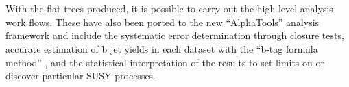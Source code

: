 \\\\
With the flat trees produced, it is possible to carry out the high level analysis work flows. These have also been ported to the new ``AlphaTools'' analysis framework and include the systematic error determination through closure tests, accurate estimation of b jet yields in each dataset with the ``b-tag formula method'' \cite{btagFormula}, and the statistical interpretation of the results to set limits on or discover particular SUSY processes.